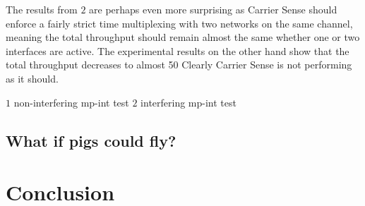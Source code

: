 \documentclass[12pt,a4paper]{article}
\begin{document}
The results from $2$ are perhaps even more surprising as Carrier Sense should
enforce a fairly strict time multiplexing with two networks on the same channel,
meaning the total throughput should remain almost the same whether one or two
interfaces are active. The experimental results on the other hand show that the
total throughput decreases to almost 50%
Clearly Carrier Sense is not performing as it should.

  $1$ non-interfering mp-int test
  $2$ interfering mp-int test
\subsection{What if pigs could fly?} %

\section{Conclusion}

%
\end{document}
